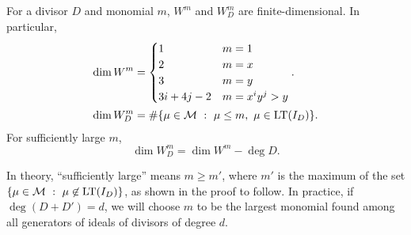 \begin{theorem}
  \label{thm_dim_W}
  For a divisor $D$ and monomial $m$, $W^m$ and $W_D^m$ are finite-dimensional.
  In particular,
  \begin{align*}
    \dim W^m &= \begin{cases}
                  1 & m = 1 \\
                  2 & m = x \\
                  3 & m = y \\
                  3i + 4j - 2 & m = x^iy^j > y
                \end{cases}. \\
    \dim W_D^m &= \# \{ \mu \in \mathcal{M} ~:~ \mu \leq m, ~\mu \in \operatorname{LT}(I_D) \}.
  \end{align*}
  For sufficiently large $m$,
  \[ \dim W_D^m = \dim W^m - \deg D.\]
\end{theorem}
In theory, ``sufficiently large'' means $m \geq m'$,
where $m'$ is the maximum of the set $\{ \mu \in \mathcal{M} ~:~ \mu \not\in \operatorname{LT}(I_D) \}$,
as shown in the proof to follow.
In practice, if $\deg(D + D') = d$, we will choose $m$ to be
the largest monomial found among all generators of ideals of divisors of degree $d$.
